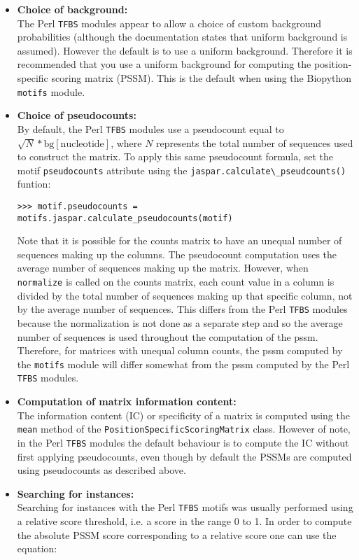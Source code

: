 \documentclass{report}
\begin{document}
\begin{itemize}
\item{\bf Choice of background:} \\
The Perl \verb+TFBS+ modules appear to allow a choice of custom background probabilities (although the documentation states that uniform background is assumed). However the default is to use a uniform background. Therefore it is recommended that you use a uniform background for computing the position-specific scoring matrix (PSSM). This is the default when using the Biopython \verb+motifs+ module.
\item{\bf Choice of pseudocounts:} \\
By default, the Perl \verb+TFBS+ modules use a pseudocount equal to $\sqrt{N} * \textrm{bg}[\textrm{nucleotide}]$, where $N$ represents the total number of sequences used to construct the matrix. To apply this same pseudocount formula, set the motif \verb+pseudocounts+ attribute using the \verb+jaspar.calculate\_pseudcounts()+ funtion:
\begin{verbatim}
>>> motif.pseudocounts = motifs.jaspar.calculate_pseudocounts(motif)
\end{verbatim}
Note that it is possible for the counts matrix to have an unequal number of sequences making up the columns. The pseudocount computation uses the average number of sequences making up the matrix. However, when \verb+normalize+ is called on the counts matrix, each count value in a column is divided by the total number of sequences making up that specific column, not by the average number of sequences. This differs from the Perl \verb+TFBS+ modules because the normalization is not done as a separate step and so the average number of sequences is used throughout the computation of the pssm. Therefore, for matrices with unequal column counts, the pssm computed by the \verb+motifs+ module will differ somewhat from the pssm computed by the Perl \verb+TFBS+ modules.
\item{\bf Computation of matrix information content:} \\
The information content (IC) or specificity of a matrix is computed using the \verb+mean+ method of the \verb+PositionSpecificScoringMatrix+ class. However of note, in the Perl \verb+TFBS+ modules the default behaviour is to compute the IC without first applying pseudocounts, even though by default the PSSMs are computed using pseudocounts as described above.
\item{\bf Searching for instances:} \\
Searching for instances with the Perl \verb+TFBS+ motifs was usually performed using a relative score threshold, i.e. a score in the range 0 to 1. In order to compute the absolute PSSM score corresponding to a relative score one can use the equation:

\end{itemize}
\end{document}

